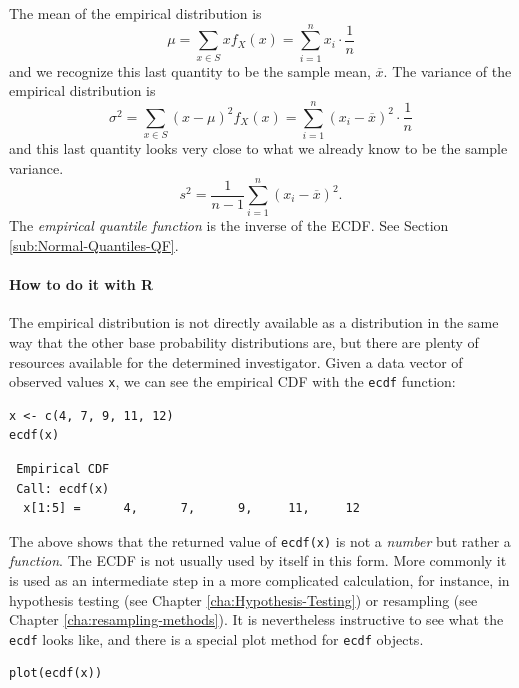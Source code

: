 \documentclass[captions=tableheading]{scrbook}
\begin{document}
The mean of the empirical distribution is
\begin{equation}
\mu=\sum_{x\in S}xf_{X}(x)=\sum_{i=1}^{n}x_{i}\cdot\frac{1}{n}
\end{equation}
and we recognize this last quantity to be the sample mean, \(\overline{x}\). The variance of the empirical distribution is
\begin{equation}
\sigma^{2}=\sum_{x\in S}(x-\mu)^{2}f_{X}(x)=\sum_{i=1}^{n}(x_{i}-\overline{x})^{2}\cdot\frac{1}{n}
\end{equation}
and this last quantity looks very close to what we already know to be the sample variance.
\begin{equation}
s^{2}=\frac{1}{n-1}\sum_{i=1}^{n}(x_{i}-\overline{x})^{2}.
\end{equation}
The \emph{empirical quantile function} is the inverse of the ECDF. See Section \ref{sub:Normal-Quantiles-QF}.


\paragraph*{How to do it with \textsf{R}}

The empirical distribution is not directly available as a distribution in the same way that the other base probability distributions are, but there are plenty of resources available for the determined investigator.  Given a data vector of observed values \texttt{x}, we can see the empirical CDF with the \texttt{ecdf} function:


\begin{verbatim}
x <- c(4, 7, 9, 11, 12)
ecdf(x)
\end{verbatim}

\begin{verbatim}
 Empirical CDF 
 Call: ecdf(x)
  x[1:5] =      4,      7,      9,     11,     12
\end{verbatim}

The above shows that the returned value of \texttt{ecdf(x)} is not a \emph{number} but rather a \emph{function}. The ECDF is not usually used by itself in this form. More commonly it is used as an intermediate step in a more complicated calculation, for instance, in hypothesis testing (see Chapter \ref{cha:Hypothesis-Testing}) or resampling (see Chapter \ref{cha:resampling-methods}). It is nevertheless instructive to see what the \texttt{ecdf} looks like, and there is a special plot method for \texttt{ecdf} objects.


\begin{verbatim}
plot(ecdf(x))
\end{verbatim}
\end{document}
